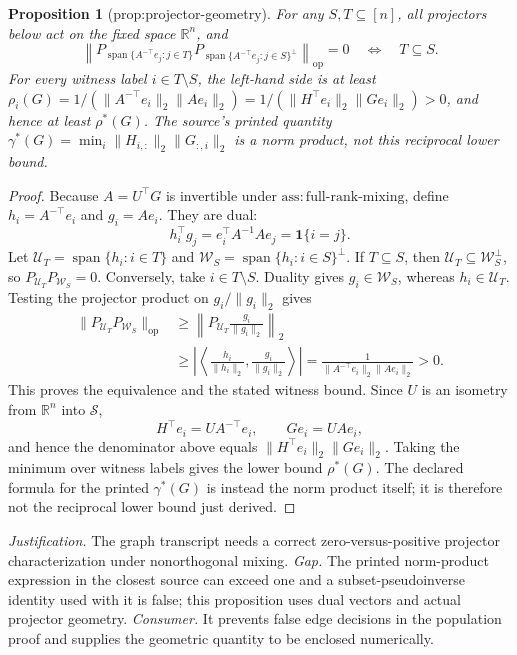 \documentclass{article}
\newtheorem{proposition}{Proposition}
\begin{document}
\begin{proposition}[prop:projector-geometry]\label{prop:projector-geometry}
For any \(S,T\subseteq[n]\), all projectors below act on the fixed space \(\mathbb R^n\), and \[\left\|P_{\operatorname{span}\{A^{-\top}e_j:j\in T\}}P_{\operatorname{span}\{A^{-\top}e_j:j\in S\}^{\perp}}\right\|_{\mathrm{op}}=0\quad\Longleftrightarrow\quad T\subseteq S.\] For every witness label \(i\in T\setminus S\), the left-hand side is at least \(\rho_i(G)=1/(\|A^{-\top}e_i\|_2\|Ae_i\|_2)=1/(\|H^{\top}e_i\|_2\|Ge_i\|_2)>0\), and hence at least \(\rho^{\ast}(G)\). The source's printed quantity \(\gamma^{\ast}(G)=\min_i\|H_{i,:}\|_2\|G_{:,i}\|_2\) is a norm product, not this reciprocal lower bound.
\end{proposition}
\begin{proof}
Because \(A=U^{\top}G\) is invertible under \(\mathrm{ass{:}full\mbox{-}rank\mbox{-}mixing}\), define
\(h_i=A^{-\top}e_i\) and \(g_i=Ae_i\).  They are dual:
\[
 h_i^{\top}g_j=e_i^{\top}A^{-1}Ae_j=\mathbf 1\{i=j\}.
\]
Let \(\mathcal U_T=\operatorname{span}\{h_i:i\in T\}\) and
\(\mathcal W_S=\operatorname{span}\{h_i:i\in S\}^{\perp}\).  If \(T\subseteq S\), then \(\mathcal U_T\subseteq\mathcal W_S^{\perp}\), so
\(P_{\mathcal U_T}P_{\mathcal W_S}=0\).  Conversely, take \(i\in T\setminus S\).  Duality gives \(g_i\in\mathcal W_S\), whereas \(h_i\in\mathcal U_T\).  Testing the projector product on \(g_i/\|g_i\|_2\) gives
\[
\begin{aligned}
 \|P_{\mathcal U_T}P_{\mathcal W_S}\|_{\mathrm{op}}
 &\ge \left\|P_{\mathcal U_T}\frac{g_i}{\|g_i\|_2}\right\|_2\\
 &\ge \left|\left\langle
       \frac{h_i}{\|h_i\|_2},\frac{g_i}{\|g_i\|_2}
       \right\rangle\right|
 =\frac{1}{\|A^{-\top}e_i\|_2\|Ae_i\|_2}>0.
\end{aligned}
\]
This proves the equivalence and the stated witness bound.  Since \(U\) is an isometry from \(\mathbb R^n\) into \(\mathcal S\),
\[
 H^{\top}e_i=UA^{-\top}e_i,
 \qquad Ge_i=UAe_i,
\]
and hence the denominator above equals
\(\|H^{\top}e_i\|_2\|Ge_i\|_2\).  Taking the minimum over witness labels gives the lower bound \(\rho^{\ast}(G)\).  The declared formula for the printed \(\gamma^{\ast}(G)\) is instead the norm product itself; it is therefore not the reciprocal lower bound just derived.
\end{proof}
\par\smallskip\noindent \textit{Justification.} The graph transcript needs a correct zero-versus-positive projector characterization under nonorthogonal mixing. \textit{Gap.} The printed norm-product expression in the closest source can exceed one and a subset-pseudoinverse identity used with it is false; this proposition uses dual vectors and actual projector geometry. \textit{Consumer.} It prevents false edge decisions in the population proof and supplies the geometric quantity to be enclosed numerically.
\end{document}
